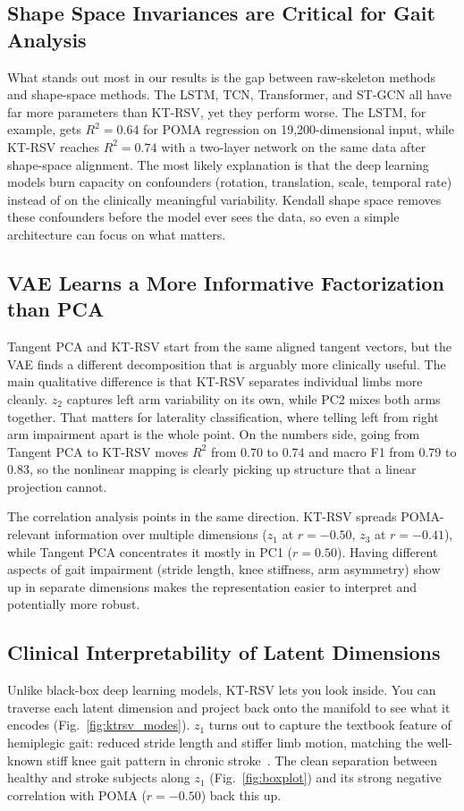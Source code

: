 \documentclass{article}
\begin{document}
\subsection{Shape Space Invariances are Critical for Gait Analysis}
What stands out most in our results is the gap between raw-skeleton methods and shape-space methods. The LSTM, TCN, Transformer, and ST-GCN all have far more parameters than KT-RSV, yet they perform worse. The LSTM, for example, gets $R^2 = 0.64$ for POMA regression on 19,200-dimensional input, while KT-RSV reaches $R^2 = 0.74$ with a two-layer network on the same data after shape-space alignment. The most likely explanation is that the deep learning models burn capacity on confounders (rotation, translation, scale, temporal rate) instead of on the clinically meaningful variability. Kendall shape space removes these confounders before the model ever sees the data, so even a simple architecture can focus on what matters.

\subsection{VAE Learns a More Informative Factorization than PCA}
Tangent PCA and KT-RSV start from the same aligned tangent vectors, but the VAE finds a different decomposition that is arguably more clinically useful. The main qualitative difference is that KT-RSV separates individual limbs more cleanly. $z_2$ captures left arm variability on its own, while PC2 mixes both arms together. That matters for laterality classification, where telling left from right arm impairment apart is the whole point. On the numbers side, going from Tangent PCA to KT-RSV moves $R^2$ from 0.70 to 0.74 and macro F1 from 0.79 to 0.83, so the nonlinear mapping is clearly picking up structure that a linear projection cannot.

The correlation analysis points in the same direction. KT-RSV spreads POMA-relevant information over multiple dimensions ($z_1$ at $r = -0.50$, $z_3$ at $r = -0.41$), while Tangent PCA concentrates it mostly in PC1 ($r = 0.50$). Having different aspects of gait impairment (stride length, knee stiffness, arm asymmetry) show up in separate dimensions makes the representation easier to interpret and potentially more robust.

\subsection{Clinical Interpretability of Latent Dimensions}
Unlike black-box deep learning models, KT-RSV lets you look inside. You can traverse each latent dimension and project back onto the manifold to see what it encodes (Fig.~\ref{fig:ktrsv_modes}). $z_1$ turns out to capture the textbook feature of hemiplegic gait: reduced stride length and stiffer limb motion, matching the well-known stiff knee gait pattern in chronic stroke~\cite{li2023stiff}. The clean separation between healthy and stroke subjects along $z_1$ (Fig.~\ref{fig:boxplot}) and its strong negative correlation with POMA ($r = -0.50$) back this up.
\end{document}
